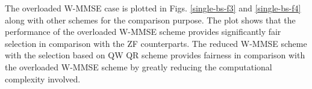 The overloaded W-MMSE case is plotted in Figs. \ref{single-bs-f3} and  \ref{single-bs-f4} along with other schemes for the comparison purpose. The plot shows that the performance of the overloaded W-MMSE scheme provides significantly fair selection in comparison with the ZF counterparts. The reduced W-MMSE scheme with the selection based on QW QR scheme provides fairness in comparison with the overloaded W-MMSE scheme by greatly reducing the computational complexity involved.
